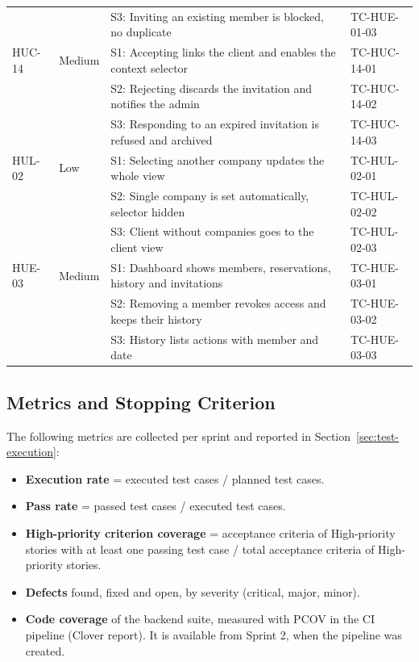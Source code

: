 \begin{longtable}{@{}L{1.5cm}L{1.5cm}L{8.3cm}L{2.7cm}@{}}
         &      & S3: Inviting an existing member is blocked, no duplicate & TC-HUE-01-03 \\
  HUC-14 & Medium & S1: Accepting links the client and enables the context selector & TC-HUC-14-01 \\
         &      & S2: Rejecting discards the invitation and notifies the admin & TC-HUC-14-02 \\
         &      & S3: Responding to an expired invitation is refused and archived & TC-HUC-14-03 \\
  HUL-02 & Low  & S1: Selecting another company updates the whole view & TC-HUL-02-01 \\
         &      & S2: Single company is set automatically, selector hidden & TC-HUL-02-02 \\
         &      & S3: Client without companies goes to the client view & TC-HUL-02-03 \\
  HUE-03 & Medium & S1: Dashboard shows members, reservations, history and invitations & TC-HUE-03-01 \\
         &      & S2: Removing a member revokes access and keeps their history & TC-HUE-03-02 \\
         &      & S3: History lists actions with member and date & TC-HUE-03-03 \\
  \bottomrule
\end{longtable}

\subsection{Metrics and Stopping Criterion}

The following metrics are collected per sprint and reported in Section~\ref{sec:test-execution}:

\begin{itemize}
  \item \textbf{Execution rate} = executed test cases / planned test cases.
  \item \textbf{Pass rate} = passed test cases / executed test cases.
  \item \textbf{High-priority criterion coverage} = acceptance criteria of High-priority stories
        with at least one passing test case / total acceptance criteria of High-priority stories.
  \item \textbf{Defects} found, fixed and open, by severity (critical, major, minor).
  \item \textbf{Code coverage} of the backend suite, measured with PCOV in the CI pipeline
        (Clover report). It is available from Sprint 2, when the pipeline was created.
\end{itemize}

